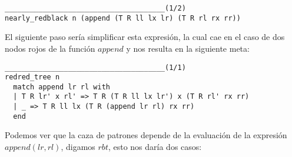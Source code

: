 \begin{verbatim}
______________________________________(1/2)
nearly_redblack n (append (T R ll lx lr) (T R rl rx rr))
\end{verbatim}

El siguiente paso ser\'ia simplificar esta expresión, la cual cae en el caso de dos nodos rojos de la 
función \hyperref[func_app]{$append$} y nos resulta en la siguiente meta:

\begin{verbatim}
______________________________________(1/1)
redred_tree n
  match append lr rl with
  | T R lr' x rl' => T R (T R ll lx lr') x (T R rl' rx rr)
  | _ => T R ll lx (T R (append lr rl) rx rr)
  end
\end{verbatim}

Podemos ver que la caza de patrones depende de la evaluaci\'on de la expresi\'on $append(lr,rl)$,
digamos $rbt$, esto nos dar\'ia dos casos:

